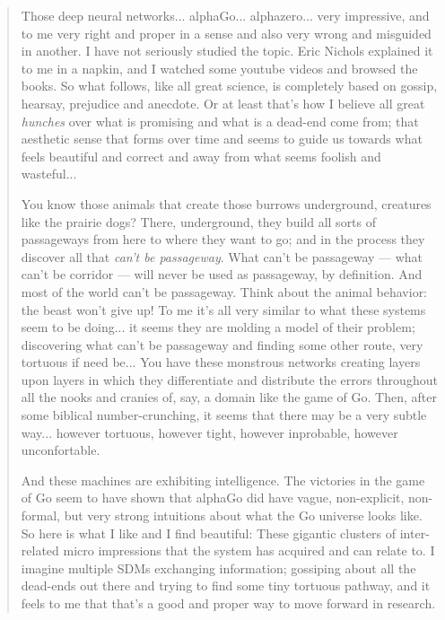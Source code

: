 \begin{quote}

    Those deep neural networks... alphaGo... alphazero... very impressive, and to me very right and proper in a sense and also very wrong and misguided in another. I have not seriously studied the topic. Eric Nichols explained it to me in a napkin, and I watched some youtube videos and browsed the books. So what follows, like all great science, is completely based on gossip, hearsay, prejudice and anecdote.  Or at least that's how I believe all great \emph{hunches} over what is promising and what is a dead-end come from; that aesthetic sense that forms over time and seems to guide us towards what feels beautiful and correct and away from what seems foolish and wasteful...

    You know those animals that create those burrows underground, creatures like the prairie dogs?  There, underground, they build all sorts of passageways from here to where they want to go; and in the process they discover all that \emph{can't be passageway}.  What can't be passageway --- what can't be corridor --- will never be used as passageway, by definition.  And most of the world can't be passageway.  Think about the animal behavior: the beast won't give up! To me it's all very similar to what these systems seem to be doing... it seems they are molding a model of their problem; discovering what can't be passageway and finding some other route, very tortuous if need be...  You have these monstrous networks creating layers upon layers in which they differentiate and distribute the errors throughout all the nooks and cranies of, say, a domain like the game of Go.  Then, after some biblical number-crunching, it seems that there may be a very subtle way... however tortuous, however tight, however inprobable, however unconfortable.

    And these machines are exhibiting intelligence.  The victories in the game of Go seem to have shown that alphaGo did have vague, non-explicit, non-formal, but very strong intuitions about what the Go universe looks like.  So here is what I like and I find beautiful:  These gigantic clusters of inter-related micro impressions that the system has acquired and can relate to.  I imagine multiple SDMs exchanging information; gossiping about all the dead-ends out there and trying to find some tiny tortuous pathway, and it feels to me that that's a good and proper way to move forward in research.


\end{quote}
